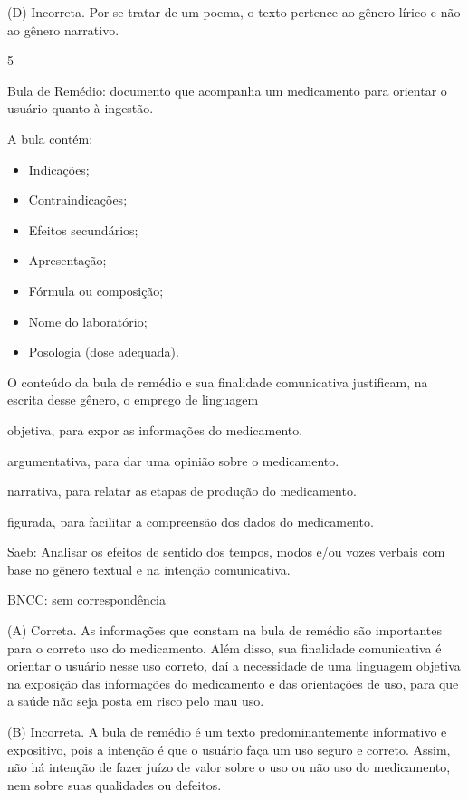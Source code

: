 (D) Incorreta. Por se tratar de um poema, o texto pertence ao gênero
lírico e não ao gênero narrativo.

\num{5}

Bula de Remédio: documento que acompanha um medicamento para orientar o
usuário quanto à ingestão.

A bula contém:

\begin{itemize}
\item
  Indicações;
\item
  Contraindicações;
\item
  Efeitos secundários;
\item
  Apresentação;
\item
  Fórmula ou composição;
\item
  Nome do laboratório;
\item
  Posologia (dose adequada).
\end{itemize}


O conteúdo da bula de remédio e sua finalidade comunicativa justificam,
na escrita desse gênero, o emprego de linguagem

\begin{escolha}
\item objetiva, para expor as informações do medicamento.

\item argumentativa, para dar uma opinião sobre o medicamento.

\item narrativa, para relatar as etapas de produção do medicamento.

\item figurada, para facilitar a compreensão dos dados do medicamento.
\end{escolha}

Saeb: Analisar os efeitos de sentido dos tempos, modos e/ou vozes
verbais com base no gênero textual e na intenção comunicativa.

BNCC: sem correspondência

(A) Correta. As informações que constam na bula de remédio são
importantes para o correto uso do medicamento. Além disso, sua
finalidade comunicativa é orientar o usuário nesse uso correto, daí a
necessidade de uma linguagem objetiva na exposição das informações do
medicamento e das orientações de uso, para que a saúde não seja posta em
risco pelo mau uso.

(B) Incorreta. A bula de remédio é um texto predominantemente
informativo e expositivo, pois a intenção é que o usuário faça um uso
seguro e correto. Assim, não há intenção de fazer juízo de valor sobre o
uso ou não uso do medicamento, nem sobre suas qualidades ou defeitos.

